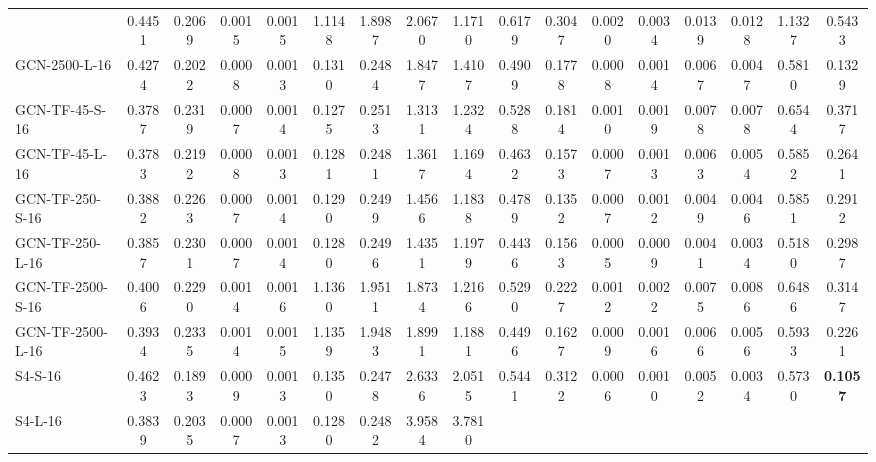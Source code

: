 \begin{table*}[h]
{\begin{tabular}{lcc|cc|cc|cc|cc|cc|cc|cc}
                & 0.4451 & 0.2069
                & 0.0015 & 0.0015 & 1.1148 & 1.8987 & 2.0670 & 1.1710 
                & 0.6179 & 0.3047
                & 0.0020 & 0.0034 & 0.0139 & 0.0128 & 1.1327 & 0.5433\\ 
            GCN-2500-L-16 
                & 0.4274 & 0.2022
                & 0.0008 & 0.0013 & 0.1310 & 0.2484 & 1.8477 & 1.4107 
                & 0.4909 & 0.1778
                & 0.0008 & 0.0014 & 0.0067 & 0.0047 & 0.5810 & 0.1329\\ 
            \midrule
            GCN-TF-45-S-16 
                & 0.3787 & 0.2319
                & 0.0007 & 0.0014 & 0.1275 & 0.2513 & 1.3131 & 1.2324 
                & 0.5288 & 0.1814
                & 0.0010 & 0.0019 & 0.0078 & 0.0078 & 0.6544 & 0.3717\\ 
            GCN-TF-45-L-16 
                & 0.3783 & 0.2192
                & 0.0008 & 0.0013 & 0.1281 & 0.2481 & 1.3617 & 1.1694 
                & 0.4632 & 0.1573
                & 0.0007 & 0.0013 & 0.0063 & 0.0054 & 0.5852 & 0.2641\\ 
            GCN-TF-250-S-16 
                & 0.3882 & 0.2263
                & 0.0007 & 0.0014 & 0.1290 & 0.2499 & 1.4566 & 1.1838 
                & 0.4789 & 0.1352
                & 0.0007 & 0.0012 & 0.0049 & 0.0046 & 0.5851 & 0.2912\\ 
            GCN-TF-250-L-16 
                &0.3857 & 0.2301
                & 0.0007 & 0.0014 & 0.1280 & 0.2496 & 1.4351 & 1.1979 
                & 0.4436 & 0.1563
                & 0.0005 & 0.0009 & 0.0041 & 0.0034 & 0.5180 & 0.2987\\ 
            GCN-TF-2500-S-16 
                & 0.4006 & 0.2290
                & 0.0014 & 0.0016 & 1.1360 & 1.9511 & 1.8734 & 1.2166 
                & 0.5290 & 0.2227
                & 0.0012 & 0.0022 & 0.0075 & 0.0086 & 0.6486 & 0.3147\\ 
            GCN-TF-2500-L-16 
                & 0.3934 & 0.2335
                & 0.0014 & 0.0015 & 1.1359 & 1.9483 & 1.8991 & 1.1881 
                & 0.4496 & 0.1627
                & 0.0009 & 0.0016 & 0.0066 & 0.0056 & 0.5933 & 0.2261\\ 
            \midrule
            S4-S-16 
                & 0.4623 & 0.1893
                & 0.0009 & 0.0013 & 0.1350 & 0.2478 & 2.6336 & 2.0515 
                & 0.5441 & 0.3122
                & 0.0006 & 0.0010 & 0.0052 & 0.0034 & 0.5730 & \textbf{0.1057}\\ 
            S4-L-16 
                & 0.3839 & 0.2035
                & 0.0007 & 0.0013 & 0.1280 & 0.2482 & 3.9584 & 3.7810 

\end{tabular}}
\end{table*}

